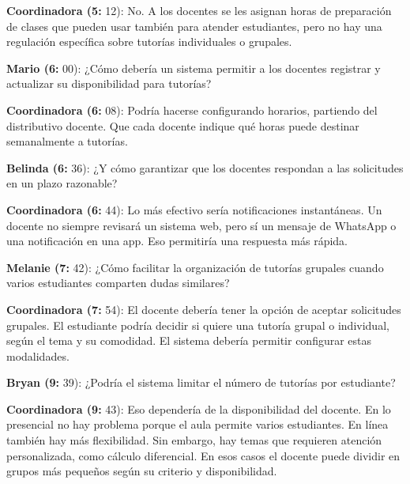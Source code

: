 \noindent\textbf{Coordinadora (5:} 12): No. A los docentes se les asignan horas de preparación de clases que pueden usar también para atender estudiantes, pero no hay una regulación específica sobre tutorías individuales o grupales.\par\smallskip

\noindent\textbf{Mario (6:} 00): ¿Cómo debería un sistema permitir a los docentes registrar y actualizar su disponibilidad para tutorías?\par\smallskip

\noindent\textbf{Coordinadora (6:} 08): Podría hacerse configurando horarios, partiendo del distributivo docente. Que cada docente indique qué horas puede destinar semanalmente a tutorías.\par\smallskip

\noindent\textbf{Belinda (6:} 36): ¿Y cómo garantizar que los docentes respondan a las solicitudes en un plazo razonable?\par\smallskip

\noindent\textbf{Coordinadora (6:} 44): Lo más efectivo sería notificaciones instantáneas. Un docente no siempre revisará un sistema web, pero sí un mensaje de WhatsApp o una notificación en una app. Eso permitiría una respuesta más rápida.\par\smallskip

\noindent\textbf{Melanie (7:} 42): ¿Cómo facilitar la organización de tutorías grupales cuando varios estudiantes comparten dudas similares?\par\smallskip

\noindent\textbf{Coordinadora (7:} 54): El docente debería tener la opción de aceptar solicitudes grupales. El estudiante podría decidir si quiere una tutoría grupal o individual, según el tema y su comodidad. El sistema debería permitir configurar estas modalidades.\par\smallskip

\noindent\textbf{Bryan (9:} 39): ¿Podría el sistema limitar el número de tutorías por estudiante?\par\smallskip

\noindent\textbf{Coordinadora (9:} 43): Eso dependería de la disponibilidad del docente. En lo presencial no hay problema porque el aula permite varios estudiantes. En línea también hay más flexibilidad. Sin embargo, hay temas que requieren atención personalizada, como cálculo diferencial. En esos casos el docente puede dividir en grupos más pequeños según su criterio y disponibilidad.\par\smallskip

